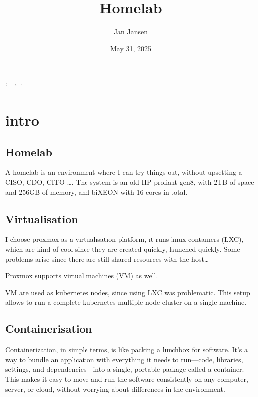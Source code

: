 \documentclass[letterpaper,10pt,english]{sphinxmanual}
\title{Homelab}
\date{May 31, 2025}
\author{Jan Jansen}
\begin{document}
\ifdefined\shorthandoff
  \ifnum\catcode`\=\string=\active\shorthandoff{=}\fi
  \ifnum\catcode`\"=\active{}\fi
\fi

\pagestyle{empty}
\sphinxmaketitle
\pagestyle{plain}
\sphinxtableofcontents
\pagestyle{normal}
\label{\detokenize{index::doc}}


\sphinxstepscope


\chapter{intro}
\label{\detokenize{intro:intro}}\label{\detokenize{intro::doc}}

\section{Homelab}
\label{\detokenize{intro:homelab}}
\sphinxAtStartPar
A homelab is an environment where I can try things out, without upsetting a CISO, CDO, CITO ….
The system is an old HP proliant gen8, with 2TB of space and 256GB of memory, and bi\sphinxhyphen{}XEON with 16 cores in total.


\section{Virtualisation}
\label{\detokenize{intro:virtualisation}}
\sphinxAtStartPar
I choose proxmox as a virtualisation platform, it runs linux containers (LXC), which are kind of cool since they are created quickly, launched quickly. Some problems arise since there are still shared resources with the host…

\sphinxAtStartPar
Proxmox supports virtual machines (VM) as well.

\sphinxAtStartPar
VM are used as kubernetes nodes, since using LXC was problematic.
This setup allows to run a complete kubernetes multiple node cluster on a single machine.


\section{Containerisation}
\label{\detokenize{intro:containerisation}}
\sphinxAtStartPar
Containerization, in simple terms, is like packing a lunchbox for software. It’s a way to bundle an application with everything it needs to run—code, libraries, settings, and dependencies—into a single, portable package called a container. This makes it easy to move and run the software consistently on any computer, server, or cloud, without worrying about differences in the environment.
\end{document}
